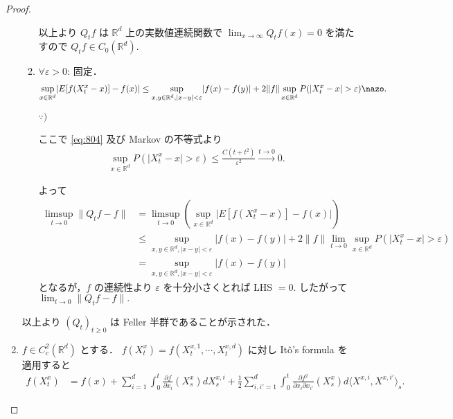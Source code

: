 \documentclass{jsarticle}
\begin{document}
\begin{proof}
\begin{enumerate}[label=(\arabic*)]
\begin{enumerate}[label=(\roman*)]
            以上より $Q_{t}f$ は $\mathbb{R}^d$ 上の実数値連続関数で $\lim_{x\to\infty}Q_{t}f(x)=0$ を満たすので $Q_{t}f\in C_{0}(\mathbb{R}^d).$
                
            \item
            $\forall \varepsilon>0$: 固定．
            \begin{align}
                \sup_{x\in\mathbb{R}^d}\lvert E[f(X_{t}^{x}-x)]-f(x)\rvert
                \le \sup_{x, y\in\mathbb{R}^d, \lvert x-y\rvert<\varepsilon}\lvert f(x)-f(y)\rvert
                + 2\lVert f\rVert\sup_{x\in\mathbb{R}^d}P(\lvert X_{t}^{x}-x\rvert>\varepsilon)\nazo.
            \end{align}
            
            \begin{screen}
                $\because)$
            \end{screen}

            ここで \eqref{eq:804} 及び Markov の不等式より
            \begin{align}
                \sup_{x\in\mathbb{R}^d}P(\lvert X_{t}^{x}-x\rvert>\varepsilon)
                \le \frac{C(t+t^2)}{\varepsilon^2}\xrightarrow{t\to0}0.
            \end{align}

            よって
            \begin{align}
                \limsup_{t\to0}\lVert Q_{t}f-f\rVert
                &= \limsup_{t\to0}(\sup_{x\in\mathbb{R}^d}\lvert E[f(X_{t}^{x}-x)]-f(x)\rvert) \\
                &\le \sup_{x, y\in\mathbb{R}^d, \lvert x-y\rvert<\varepsilon}\lvert f(x)-f(y)\rvert
                + 2\lVert f\rVert\lim_{t\to0}\sup_{x\in\mathbb{R}^d}P(\lvert X_{t}^{x}-x\rvert>\varepsilon) \\
                &= \sup_{x, y\in\mathbb{R}^d, \lvert x-y\rvert<\varepsilon}\lvert f(x)-f(y)\rvert
            \end{align}
            となるが，$f$ の連続性より $\varepsilon$ を十分小さくとれば LHS $=0.$
            したがって $\lim_{t\to0}\lVert Q_{t}f-f\rVert.$
        \end{enumerate}

        以上より $(Q_{t})_{t\ge0}$ は Feller 半群であることが示された．
        
        \item
        $f\in C_{c}^2(\mathbb{R}^d)$ とする．
        $f(X_{t}^{x})=f(X_{t}^{x, 1},\dotsb, X_{t}^{x, d})$ に対し It\^{o}'s formula を適用すると
        \begin{align}
            f(X_{t}^{x})
            &= f(x)
            + \sum_{i=1}^{d}\int_{0}^{t}\frac{\partial f}{\partial x_{i}}(X_{s}^{x})dX_{s}^{x, i}
            + \frac{1}{2}\sum_{i, i'=1}^{d}\int_{0}^{t}\frac{\partial f^2}{\partial x_{i}\partial x_{i'}}(X_{s}^{x})d\langle X^{x, i}, X^{x, i'}\rangle_{s}.
        \end{align}


\end{enumerate}
\end{proof}
\end{document}
